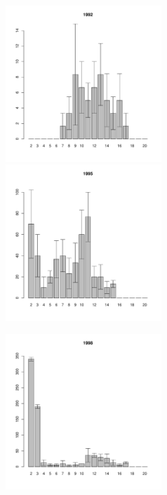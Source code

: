 \documentclass[12pt, a4paper]{article}
\begin{document}





\newpage \begin{figure}[h] 

\begin{multicols}{3}
\hfill
\includegraphics[width=60mm]{../White_Sea/Estuatiy_Luvenga/sizestr2_1992_.pdf}
\hfill
\includegraphics[width=60mm]{../White_Sea/Estuatiy_Luvenga/sizestr2_1995_.pdf}

\hfill
\includegraphics[width=60mm]{../White_Sea/Estuatiy_Luvenga/sizestr2_1998_.pdf}


\end{multicols}
\end{figure}
\end{document}
